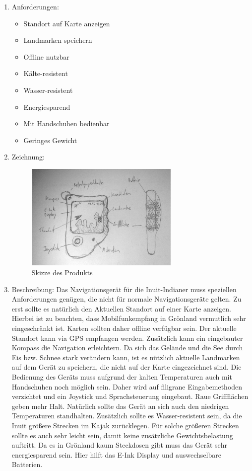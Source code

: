 \documentclass[a4paper,10pt]{article}
\begin{document}
\kopf
\renewcommand{\figurename}{Abbildung}

\begin{enumerate}

\item Anforderungen:
\begin{itemize}
	\item Standort auf Karte anzeigen
	\item Landmarken speichern
	\item Offline nutzbar
	\item Kälte-resistent
	\item Wasser-resistent
	\item Energiesparend
	\item Mit Handschuhen bedienbar
	\item Geringes Gewicht
\end{itemize}
	
\item Zeichnung:
\begin{figure}[ht]
\centering \includegraphics[width=0.7\textwidth]{icg1.jpg}
\caption{Skizze des Produkts}
\end{figure}

\item Beschreibung:\newline
Das Navigationsgerät für die Inuit-Indianer muss speziellen Anforderungen genügen, die nicht für normale Navigationsgeräte gelten. Zu erst sollte es natürlich den Aktuellen Standort auf einer Karte anzeigen. Hierbei ist zu beachten, dass Mobilfunkempfang in Grönland vermutlich sehr eingeschränkt ist. Karten sollten daher offline verfügbar sein. Der aktuelle Standort kann via GPS empfangen werden. Zusätzlich kann ein eingebauter Kompass die Navigation erleichtern. Da sich das Gelände und die See durch Eis bzw. Schnee stark verändern kann, ist es nützlich aktuelle Landmarken auf dem Gerät zu speichern, die nicht auf der Karte eingezeichnet sind. Die Bedienung des Geräts muss aufgrund der kalten Temperaturen auch mit Handschuhen noch möglich sein. Daher wird auf filigrane Eingabemethoden verzichtet und ein Joystick und Sprachsteuerung eingebaut. Raue Griffflächen geben mehr Halt. Natürlich sollte das Gerät an sich auch den niedrigen Temperaturen standhalten. Zusätzlich sollte es Wasser-resistent sein, da die Inuit größere Strecken im Kajak zurücklegen. Für solche größeren Strecken sollte es auch sehr leicht sein, damit keine zusätzliche Gewichtsbelastung auftritt. Da es in Grönland kaum Steckdosen gibt muss das Gerät sehr energiesparend sein. Hier hilft das E-Ink Display und auswechselbare Batterien.

\end{enumerate}
\end{document}
